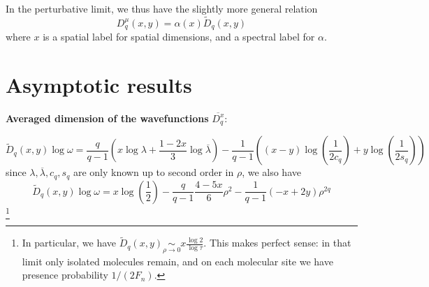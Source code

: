 \documentclass[11pt]{article}
\newcommand{\simlim}[2]{\ensuremath{ \underset{#1 \rightarrow #2}{\sim} }}
\newcommand{\om}{\ensuremath{\omega}}
\newcommand{\lb}{\ensuremath{\lambda}}
\newcommand{\lbbar}{\ensuremath{\overline{\lambda}}}
\begin{document}
In the perturbative limit, we thus have the slightly more general relation
\begin{equation}
	D^\mu_q(x,y) = \alpha(x) \tilde{D}_q(x,y)
\end{equation}
where $x$ is a spatial label for spatial dimensions, and a spectral label for $\alpha$.

\section{Asymptotic results}

\textbf{Averaged dimension of the wavefunctions} $\boxed{\overline{D^x_q}}$:

\begin{equation}
	\tilde{D}_q(x,y) \log \om = \frac{q}{q-1} \left( x \log \lb + \frac{1-2x}{3} \log \lbbar \right) - \frac{1}{q-1}\left( (x-y) \log\left(\frac{1}{2 c_q}\right) + y \log\left(\frac{1}{2 s_q}\right) \right)
\end{equation} 
since $\lb, \lbbar, c_q, s_q$ are only known up to second order in $\rho$, we also have
\begin{equation}
	\tilde{D}_q(x,y) \log \om = x \log\left( \frac{1}{2} \right) -\frac{q}{q-1} \frac{4-5x}{6} \rho^2 -\frac{1}{q-1}(-x+2y) \rho^{2q}
\end{equation}
\footnote{In particular, we have $\tilde{D}_q(x,y) \simlim{\rho}{0} x\frac{\log 2}{\log \tau}$. This makes perfect sense: in that limit only isolated molecules remain, and on each molecular site we have presence probability $1/(2 F_n)$.}


{}

\end{document}
